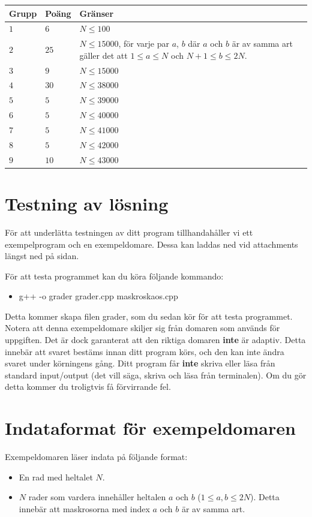\noindent
\begin{tabular}{| l | l | p{12cm} |}
  \hline
  \textbf{Grupp} & \textbf{Poäng} & \textbf{Gränser} \\ \hline
  $1$    & $6$         & $N \leq 100$  \\ \hline
  $2$    & $25$        & $N \leq 15000$, för varje par $a$, $b$ där $a$ och $b$ är av samma art gäller det att
  $1 \leq a \leq N$ och $N+1 \leq b \leq 2N$. \\ \hline
  $3$    & $9$         & $N \leq 15000$ \\ \hline
  $4$    & $30$        & $N \leq 38000$ \\ \hline
  $5$    & $5$         & $N \leq 39000$ \\ \hline
  $6$    & $5$         & $N \leq 40000$ \\ \hline
  $7$    & $5$         & $N \leq 41000$ \\ \hline
  $8$    & $5$         & $N \leq 42000$ \\ \hline
  $9$    & $10$        & $N \leq 43000$ \\ \hline
\end{tabular}

\section*{Testning av lösning}
För att underlätta testningen av ditt program tillhandahåller vi ett exempelprogram och en exempeldomare. Dessa kan laddas ned
vid attachments längst ned på sidan. 

För att testa programmet kan du köra följande kommando:
\begin{itemize}
  \item g++ -o grader grader.cpp maskroskaos.cpp
\end{itemize}

Detta kommer skapa filen grader, som du sedan kör för att testa programmet. Notera att denna exempeldomare skiljer sig från
domaren som används för uppgiften. Det är dock garanterat att den riktiga domaren \textbf{inte} är adaptiv. Detta innebär
att svaret bestäms innan ditt program körs, och den kan inte ändra svaret under körningens gång. Ditt program får \textbf{inte}
skriva eller läsa från standard input/output (det vill säga, skriva och läsa från terminalen). Om du gör detta kommer du
troligtvis få förvirrande fel.

\section*{Indataformat för exempeldomaren}
Exempeldomaren läser indata på följande format:
\begin{itemize}
  \item En rad med heltalet $N$.
  \item $N$ rader som vardera innehåller heltalen $a$ och $b$ ($1 \leq a,b \leq 2N$). Detta innebär att maskrosorna med
  index $a$ och $b$ är av samma art. 
\end{itemize}

